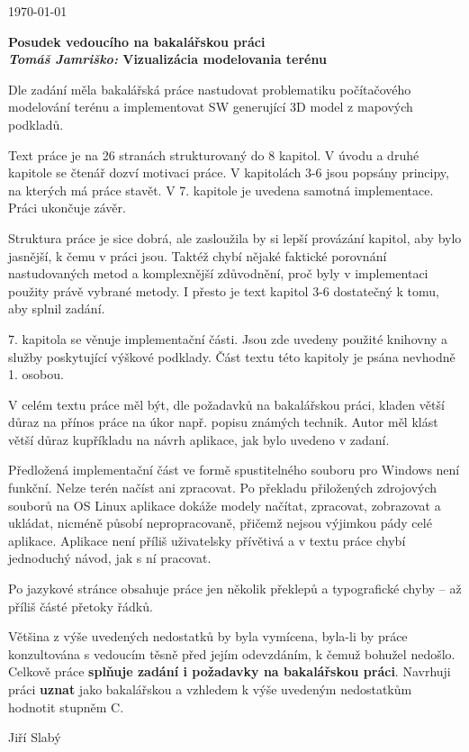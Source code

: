 \documentclass{article}
\begin{document}
\begin{flushright}
\today
\end{flushright}
\begin{center}
\Large\textbf{Posudek vedoucího na bakalářskou práci \\
\normalsize%
\textit{Tomáš Jamriško:} Vizualizácia modelovania terénu}
\end{center}

Dle zadání měla bakalářská práce nastudovat problematiku počítačového
modelování terénu a implementovat SW generující 3D model z mapových podkladů.

Text práce je na 26 stranách strukturovaný do 8 kapitol. V úvodu a druhé
kapitole se čtenář dozví motivaci práce. V kapitolách 3-6 jsou popsány
principy, na kterých má práce stavět. V 7. kapitole je uvedena samotná
implementace. Práci ukončuje závěr.

Struktura práce je sice dobrá, ale zasloužila by si lepší provázání kapitol,
aby bylo jasnější, k čemu v práci jsou. Taktéž chybí nějaké faktické porovnání
nastudovaných metod a komplexnější zdůvodnění, proč byly v implementaci
použity právě vybrané metody. I přesto je text kapitol 3-6 dostatečný k tomu,
aby splnil zadání.

7. kapitola se věnuje implementační části. Jsou zde uvedeny použité knihovny a
služby poskytující výškové podklady. Část textu této kapitoly je psána
nevhodně 1. osobou.

V celém textu práce měl být, dle požadavků na bakalářskou práci, kladen větší
důraz na přínos práce na úkor např. popisu známých technik. Autor měl klást
větší důraz kupříkladu na návrh aplikace, jak bylo uvedeno v zadaní.

Předložená implementační část ve formě spustitelného souboru pro Windows není
funkční. Nelze terén načíst ani zpracovat. Po překladu přiložených zdrojových
souborů na OS Linux aplikace dokáže modely načítat, zpracovat, zobrazovat a
ukládat, nicméně působí nepropracovaně, přičemž nejsou výjimkou pády celé
aplikace. Aplikace není příliš uživatelsky přívětivá a v textu práce chybí
jednoduchý návod, jak s ní pracovat.

Po jazykové stránce obsahuje práce jen několik překlepů a typografické chyby
-- až příliš částé přetoky řádků.

Většina z výše uvedených nedostatků by byla vymícena, byla-li by práce
konzultována s vedoucím těsně před jejím odevzdáním, k čemuž bohužel nedošlo.
Celkově práce \textbf{splňuje zadání i požadavky na bakalářskou práci}.
Navrhuji práci \textbf{uznat} jako bakalářskou a vzhledem k výše uvedeným
nedostatkům hodnotit stupněm C.

\begin{flushright}
Jiří Slabý
\end{flushright}
\end{document}
